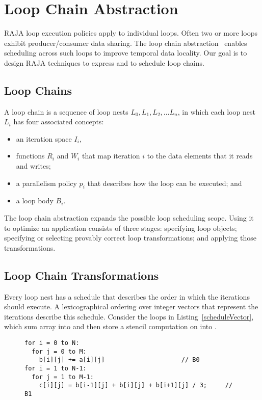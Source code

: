 \section{Loop Chain Abstraction}

\label{sec:loopchain}
RAJA loop execution policies apply to individual loops.
Often two or more loops exhibit producer/consumer data sharing.
The loop chain abstraction~\cite{krieger2013} enables scheduling
across such loops to improve temporal data locality. 
Our goal is to design RAJA techniques to express and to schedule loop chains.

\subsection{Loop Chains}

A loop chain is a sequence of loop nests $L_{0}, L_{1}, L_{2}, ... L_{n}$,
in which each loop nest $L_{i}$ has four associated concepts:
\begin{itemize}
\item an iteration space $I_{i}$,
\item functions $R_{i}$ and $W_{i}$ that map iteration $i$ to the data 
      elements that it reads and writes;
\item a parallelism policy $p_{i}$ that describes how the loop can be executed; and
\item a loop body $B_{i}$.
\end{itemize} 

The loop chain abstraction expands the possible loop scheduling scope.
Using it to optimize an application consists of three stages:
specifying loop objects; specifying or selecting provably correct loop
transformations; and applying those transformations.

\subsection{Loop Chain Transformations}

Every loop nest has a schedule that describes the order in which the 
iterations should execute.
A lexicographical ordering over integer vectors that represent the
iterations describe this schedule.
Consider the loops in Listing~\ref{scheduleVector}, which sum array
 into  and then store a stencil computation on 
into .

%
\begin{figure}[t]
\begin{lstlisting}[label={scheduleVector},caption={Example Loop Chain}]
for i = 0 to N:
  for j = 0 to M:
    b[i][j] += a[i][j]                     // B0
for i = 1 to N-1:
  for j = 1 to M-1:
    c[i][j] = b[i-1][j] + b[i][j] + b[i+1][j] / 3;     // B1
\end{lstlisting}
\end{figure}

